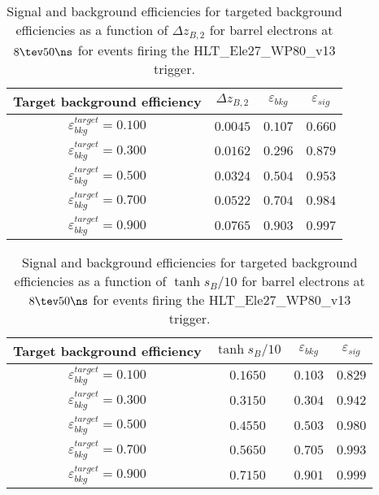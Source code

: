 \clearpage

\begin{table}[!bht]
  \begin{center}
    \begin{tabular}{cccc}
      \hline
      Target background efficiency & $\Delta z_{B,2}$ & $\varepsilon_{bkg}$ & $\varepsilon_{sig}$ \\ 
      \hline
      $\varepsilon_{bkg}^{target} = 0.100$ & $  0.0045$ & $0.107$ & $0.660$ \\
      $\varepsilon_{bkg}^{target} = 0.300$ & $  0.0162$ & $0.296$ & $0.879$ \\
      $\varepsilon_{bkg}^{target} = 0.500$ & $  0.0324$ & $0.504$ & $0.953$ \\
      $\varepsilon_{bkg}^{target} = 0.700$ & $  0.0522$ & $0.704$ & $0.984$ \\
      $\varepsilon_{bkg}^{target} = 0.900$ & $  0.0765$ & $0.903$ & $0.997$ \\
      \hline
    \end{tabular}
    \caption{Signal and background efficiencies for targeted background efficiencies as a function of $\Delta z_{B,2}$ for barrel electrons at $8\tev 50\ns$ for events firing the HLT\_Ele27\_WP80\_v13 trigger.}
    \label{tab:eff_rej_z2B_beam_8_50_trigger_27_B}
  \end{center}
\end{table}

\clearpage

\begin{table}[!bht]
  \begin{center}
    \begin{tabular}{cccc}
      \hline
      Target background efficiency & $\tanh{s_B/10}$ & $\varepsilon_{bkg}$ & $\varepsilon_{sig}$ \\ 
      \hline
      $\varepsilon_{bkg}^{target} = 0.100$ & $  0.1650$ & $0.103$ & $0.829$ \\
      $\varepsilon_{bkg}^{target} = 0.300$ & $  0.3150$ & $0.304$ & $0.942$ \\
      $\varepsilon_{bkg}^{target} = 0.500$ & $  0.4550$ & $0.503$ & $0.980$ \\
      $\varepsilon_{bkg}^{target} = 0.700$ & $  0.5650$ & $0.705$ & $0.993$ \\
      $\varepsilon_{bkg}^{target} = 0.900$ & $  0.7150$ & $0.901$ & $0.999$ \\
      \hline
    \end{tabular}
    \caption{Signal and background efficiencies for targeted background efficiencies as a function of $\tanh{s_B/10}$ for barrel electrons at $8\tev 50\ns$ for events firing the HLT\_Ele27\_WP80\_v13 trigger.}
    \label{tab:eff_rej_sB_beam_8_50_trigger_27_B}
  \end{center}
\end{table}

